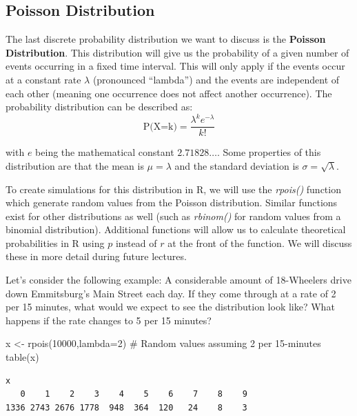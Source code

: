 \documentclass[
  letterpaper,
  DIV=11,
  numbers=noendperiod]{scrreprt}
\newenvironment{Shaded}{\begin{snugshade}}{\end{snugshade}}
\newcommand{\AttributeTok}[1]{\textcolor[rgb]{0.40,0.45,0.13}{#1}}
\newcommand{\CommentTok}[1]{\textcolor[rgb]{0.37,0.37,0.37}{#1}}
\newcommand{\DecValTok}[1]{\textcolor[rgb]{0.68,0.00,0.00}{#1}}
\newcommand{\FunctionTok}[1]{\textcolor[rgb]{0.28,0.35,0.67}{#1}}
\newcommand{\NormalTok}[1]{\textcolor[rgb]{0.00,0.23,0.31}{#1}}
\newcommand{\OtherTok}[1]{\textcolor[rgb]{0.00,0.23,0.31}{#1}}
\begin{document}
\subsection{Poisson Distribution}\label{poisson-distribution}

The last discrete probability distribution we want to discuss is the
\textbf{Poisson Distribution}. This distribution will give us the
probability of a given number of events occurring in a fixed time
interval. This will only apply if the events occur at a constant rate
\(\lambda\) (pronounced ``lambda'') and the events are independent of
each other (meaning one occurrence does not affect another occurrence).
The probability distribution can be described as:
\[ \text{P(X=k)}=\frac{\lambda^ke^{-\lambda}}{k!}\]

with \(e\) being the mathematical constant \(2.71828\dots\). Some
properties of this distribution are that the mean is \(\mu=\lambda\) and
the standard deviation is \(\sigma = \sqrt{\lambda}\).

To create simulations for this distribution in R, we will use the
\emph{rpois()} function which generate random values from the Poisson
distribution. Similar functions exist for other distributions as well
(such as \emph{rbinom()} for random values from a binomial
distribution). Additional functions will allow us to calculate
theoretical probabilities in R using \(p\) instead of \(r\) at the front
of the function. We will discuss these in more detail during future
lectures.

Let's consider the following example: A considerable amount of
18-Wheelers drive down Emmitsburg's Main Street each day. If they come
through at a rate of 2 per 15 minutes, what would we expect to see the
distribution look like? What happens if the rate changes to 5 per 15
minutes?

\begin{Shaded}
\begin{Highlighting}[]
\NormalTok{x }\OtherTok{\textless{}{-}} \FunctionTok{rpois}\NormalTok{(}\DecValTok{10000}\NormalTok{,}\AttributeTok{lambda=}\DecValTok{2}\NormalTok{) }\CommentTok{\# Random values assuming 2 per 15{-}minutes}
\FunctionTok{table}\NormalTok{(x)}
\end{Highlighting}
\end{Shaded}

\begin{verbatim}
x
   0    1    2    3    4    5    6    7    8    9 
1336 2743 2676 1778  948  364  120   24    8    3 
\end{verbatim}
\end{document}
